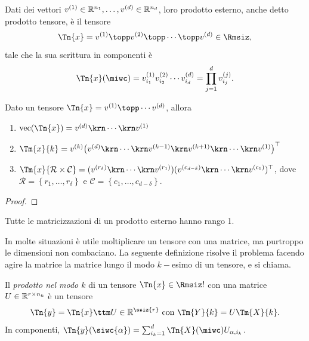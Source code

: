 \begin{definition}
  Dati dei vettori $ v^{(1)} \in \mathbb{R}^{n_1}, \ldots, v^{(d)} \in \mathbb{R}^{n_d} $, loro prodotto esterno, anche detto prodotto tensore, è il tensore
  \[
  \Tn{x} = v^{(1)} \topp v^{(2)} \topp \cdots \topp v^{(d)} \in \Rmsiz
  ,\] 
   tale che la sua scrittura in componenti è
     \[
      \Tn{x}(\miwc) = v_{i_1}^{(1)}v_{i_2}^{(2)} \cdots v_{i_d}^{(d)} = \prod_{j=1}^d v_{i_j}^{(j)}
     .\] 
\end{definition}

\begin{lemma}
  Dato un tensore $ \Tn{x} = v^{(1)} \topp \cdots v^{(d)} $, allora
  \begin{enumerate}[label=(\roman*)]
    \item $\vec(\Tn{x}) = v^{(d)} \krn \cdots \krn v^{(1)}$
  \item $ \Tm{x}{k} = v^{(k)}\left( v^{(d)} \krn \cdots \krn v^{(k-1)} \krn v^{(k+1)} \krn \cdots
    \krn v^{(1)} \right)^{\top}$
  \item $\Tm{x}{\mathcal{R} \times \mathcal{C}} = (v^{(r_\delta)} \krn \cdots \krn
    v^{(r_1)})(v^{(c_{d-\delta})} \krn \cdots \krn v^{(c_1)})^{\top}$, dove $\mathcal{R} =\left\{ r_1, \ldots,
    r_\delta \right\} $ e $ \mathcal{C} = \left\{ c_1, \ldots, c_{d-\delta}
  \right\} $.
  \end{enumerate}
\end{lemma}
\begin{proof}
\end{proof}

\begin{remark}
  Tutte le matricizzazioni di un prodotto esterno hanno rango 1.
\end{remark}

In molte situazioni è utile moltiplicare un tensore con una matrice, ma purtroppo le dimensioni non
combaciano. La seguente definizione risolve
il problema facendo agire la matrice la matrice lungo il modo $ k- $esimo di un tensore, e si
chiama.
\begin{definition}
  Il \emph{prodotto nel modo $ k $} di un tensore $ \Tn{x} \in \Rmsiz! $ con una matrice $ U \in
  \mathbb{R}^{r \times n_k} $ è un tensore 
\[
  \Tn{y} = \Tn{x} \ttm U \in \R^{\ssiz{r}} \text{ con } \Tm{Y}{k} = U \Tm{X}{k}
.\] 
In componenti, $ \Tn{y}(\siwc{\alpha}) = \sum_{i_k = 1}^d \Tn{X}(\miwc) U_{\alpha, i_k} $.
\end{definition}


